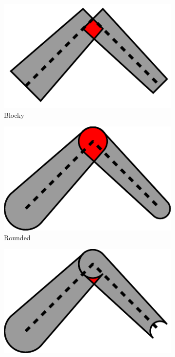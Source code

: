 \begin{figure}
\centering
\setlength{\figwidth}{.25\columnwidth}
\begin{subfigure}{\figwidth}\centering
\includegraphics[width=\columnwidth]{sources/validation/visualization_principle_blocky.pdf}
\caption{Blocky}
\end{subfigure}
\begin{subfigure}{\figwidth}\centering
\includegraphics[width=\columnwidth]{sources/validation/visualization_principle_rounded.pdf}
\caption{Rounded}
\end{subfigure}
\begin{subfigure}{\figwidth}\centering
\includegraphics[width=\columnwidth]{sources/validation/visualization_principle_rounded_excluded.pdf}

\end{subfigure}
\end{figure}
